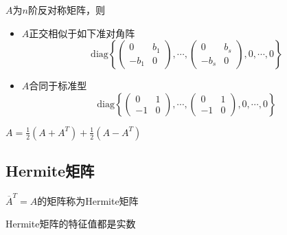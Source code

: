 \begin{theorem}[反对称矩阵的标准型]
  $A$为$n$阶反对称矩阵，则
  \begin{itemize}
  \item $A$正交相似于如下准对角阵
    \begin{equation*}
      \mathrm{diag}\left\{ \left(
          \begin{array}{cc}
            0&b_1\\
            -b_1&0
          \end{array}
        \right), \cdots,
      \left(
        \begin{array}{cc}
          0&b_s\\
          -b_s&0
        \end{array}
      \right),0,\cdots,0\right\}
    \end{equation*}
  \item $A$合同于标准型
    \begin{equation*}
      \mathrm{diag}\left\{ \left(
          \begin{array}{cc}
            0&1\\
            -1&0
          \end{array}
        \right),\cdots, \left(
          \begin{array}{cc}
            0&1\\
            -1&0
          \end{array}
        \right),0,\cdots,0 \right\}
    \end{equation*}
  \end{itemize}
\end{theorem}


\begin{theorem}
  $A = \frac{1}{2}(A + A^T) + \frac{1}{2}(A - A^T)$
\end{theorem}



\subsection{Hermite矩阵}

\begin{definition}[Hermite矩阵]
  $\overline{A}^T = A$的矩阵称为Hermite矩阵
\end{definition}

\begin{theorem}[Hermite矩阵的性质]
  Hermite矩阵的特征值都是实数
\end{theorem}



